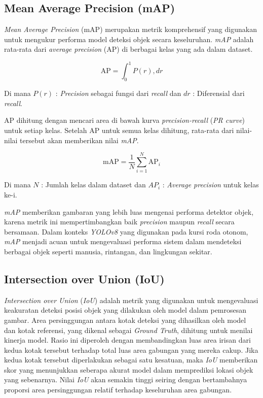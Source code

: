 \subsection{Mean Average Precision (mAP)}
\label{subsec:mAP}

\emph{Mean Average Precision} (mAP) merupakan metrik komprehensif yang digunakan untuk mengukur performa model deteksi objek secara keseluruhan. \emph{mAP} adalah rata-rata dari \emph{average precision} (AP) di berbagai kelas yang ada dalam dataset.

\begin{equation} 
  \mathrm{AP} = \int_0^1 P(r) , dr 
\end{equation}

Di mana \(P(r)\) : \emph{Precision} sebagai fungsi dari \emph{recall} dan \(dr\) : Diferensial dari \emph{recall}.

AP dihitung dengan mencari area di bawah kurva \emph{precision-recall} (\emph{PR curve}) untuk setiap kelas. Setelah AP untuk semua kelas dihitung, rata-rata dari nilai-nilai tersebut akan memberikan nilai \emph{mAP}.

\begin{equation} 
  \mathrm{mAP} = \frac{1}{N} \sum_{i=1}^{N} \mathrm{AP}_i 
\end{equation}

Di mana \(N\) : Jumlah kelas dalam dataset dan \(AP_i\) : \emph{Average precision} untuk kelas ke-i.

\emph{mAP} memberikan gambaran yang lebih luas mengenai performa detektor objek, karena metrik ini mempertimbangkan baik \emph{precision} maupun \emph{recall} secara bersamaan. Dalam konteks \emph{YOLOv8} yang digunakan pada kursi roda otonom, \emph{mAP} menjadi acuan untuk mengevaluasi performa sistem dalam mendeteksi berbagai objek seperti manusia, rintangan, dan lingkungan sekitar.

\subsection{Intersection over Union (IoU)}
\label{subsec:IoU}

\emph{Intersection over Union} (\emph{IoU}) adalah metrik yang digunakan untuk mengevaluasi keakuratan deteksi posisi objek yang dilakukan oleh model dalam pemrosesan gambar. Area persinggungan antara kotak deteksi yang dihasilkan oleh model dan kotak referensi, yang dikenal sebagai \emph{Ground Truth}, dihitung untuk menilai kinerja model. Rasio ini diperoleh dengan membandingkan luas area irisan dari kedua kotak tersebut terhadap total luas area gabungan yang mereka cakup. Jika kedua kotak tersebut diperlakukan sebagai satu kesatuan, maka \emph{IoU} memberikan skor yang menunjukkan seberapa akurat model dalam memprediksi lokasi objek yang sebenarnya. Nilai \emph{IoU} akan semakin tinggi seiring dengan bertambahnya proporsi area persinggungan relatif terhadap keseluruhan area gabungan.

